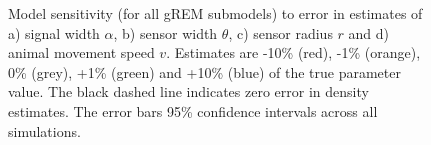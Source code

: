 \documentclass[a4paper,10pt,reqno,oneside]{amsart}
\begin{document}
\begin{figure}[h!]
\begin{subfigure}[t]{7cm}
                \caption{}               
                \label{f:speed}
        \end{subfigure}%
\caption{Model sensitivity (for all gREM submodels) to error in estimates of a) signal width $\alpha$,  b) sensor width $\theta$, c) sensor radius $r$ and d) animal movement speed $v$. Estimates are -10\% (red), -1\% (orange), 0\% (grey), +1\% (green) and +10\% (blue) of the true parameter value. The black dashed line indicates zero error in density estimates. The error bars 95\% confidence intervals across all simulations.
}

\label{f:sensitivity}
\end{figure}
\end{document}
